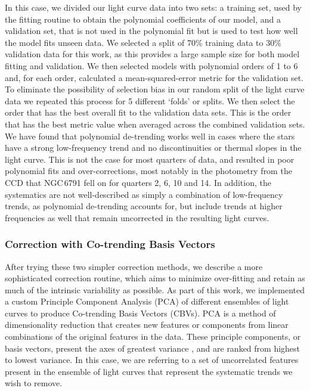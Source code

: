 In this case, we divided our light curve data into two sets: a training set, used by the fitting routine to obtain the polynomial coefficients of our model, and a validation set, that is not used in the polynomial fit but is used to test how well the model fits unseen data. We selected a split of 70\% training data to 30\% validation data for this work, as this provides a large sample size for both model fitting and validation. We then selected models with polynomial orders of 1 to 6 and, for each order, calculated a mean-squared-error metric for the validation set. To eliminate the possibility of selection bias in our random split of the light curve data we repeated this process for 5 different `folds' or splits. We then select the order that has the best overall fit to the validation data sets. This is the order that has the best metric value when averaged across the combined validation sets. We have found that polynomial de-trending works well in cases where the stars have a strong low-frequency trend and no discontinuities or thermal slopes in the light curve. This is not the case for most quarters of \Kepler{} data, and resulted in poor polynomial fits and over-corrections, most notably in the photometry from the CCD that NGC\,6791 fell on for quarters 2, 6, 10 and 14. In addition, the \Kepler{} systematics are not well-described as simply a combination of low-frequency trends, as polynomial de-trending accounts for, but include trends at higher frequencies as well that remain uncorrected in the resulting light curves. %

\subsubsection{Correction with Co-trending Basis Vectors}

After trying these two simpler correction methods, we describe a more sophisticated correction routine, which aims to minimize over-fitting and retain as much of the intrinsic variability as possible. As part of this work, we implemented a custom Principle Component Analysis (PCA) of different ensembles of light curves to produce Co-trending Basis Vectors (CBVs). PCA is a method of dimensionality reduction that creates new features or components from linear combinations of the original features in the data. These principle components, or basis vectors, present the axes of greatest variance \citep{jolliffe_principal_2016}, and are ranked from highest to lowest variance. In this case, we are referring to a set of uncorrelated features present in the ensemble of light curves that represent the systematic trends we wish to remove. 

